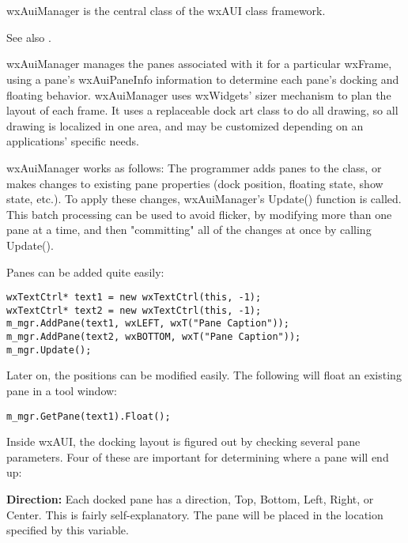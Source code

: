 \section{}\label{wxauimanager}

wxAuiManager is the central class of the wxAUI class framework.

See also .

wxAuiManager manages the panes associated with it
for a particular wxFrame, using a pane's wxAuiPaneInfo information to
determine each pane's docking and floating behavior. wxAuiManager
uses wxWidgets' sizer mechanism to plan the layout of each frame. It
uses a replaceable dock art class to do all drawing, so all drawing is
localized in one area, and may be customized depending on an
applications' specific needs.

wxAuiManager works as follows: The programmer adds panes to the class,
or makes changes to existing pane properties (dock position, floating
state, show state, etc.). To apply these changes, wxAuiManager's
Update() function is called. This batch processing can be used to avoid
flicker, by modifying more than one pane at a time, and then "committing"
all of the changes at once by calling Update().

Panes can be added quite easily:

\begin{verbatim}
wxTextCtrl* text1 = new wxTextCtrl(this, -1);
wxTextCtrl* text2 = new wxTextCtrl(this, -1);
m_mgr.AddPane(text1, wxLEFT, wxT("Pane Caption"));
m_mgr.AddPane(text2, wxBOTTOM, wxT("Pane Caption"));
m_mgr.Update();
\end{verbatim}

Later on, the positions can be modified easily. The following will float
an existing pane in a tool window:

\begin{verbatim}
m_mgr.GetPane(text1).Float();
\end{verbatim}


Inside wxAUI, the docking layout is figured out by checking several
pane parameters. Four of these are important for determining where a
pane will end up:

{\bf Direction:}
Each docked pane has a direction, Top, Bottom, Left, Right, or
Center. This is fairly self-explanatory. The pane will be placed in the
location specified by this variable.

